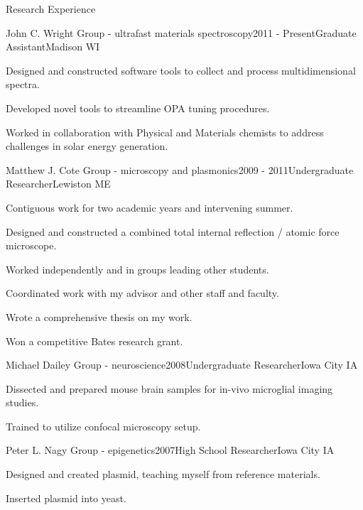 \documentclass{resume}  %
\begin{document}
\begin{rSection}{Research Experience}

\begin{rSubsection}{John C. Wright Group - ultrafast materials spectroscopy}{2011 - Present}{Graduate Assistant}{Madison WI}
\item Designed and constructed software tools to collect and process multidimensional spectra.
\item Developed novel tools to streamline OPA tuning procedures.
\item Worked in collaboration with Physical and Materials chemists to address challenges in solar energy generation.
\end{rSubsection}

\begin{rSubsection}{Matthew J. Cote Group - microscopy and plasmonics}{2009 - 2011}{Undergraduate Researcher}{Lewiston ME}
\item Contiguous work for two academic years and intervening summer.
\item Designed and constructed a combined total internal reflection / atomic force microscope.
\item Worked independently and in groups leading other students.
\item Coordinated work with my advisor and other staff and faculty.
\item Wrote a comprehensive thesis on my work.
\item Won a competitive Bates research grant.
\end{rSubsection}

\pagebreak
\begin{rSubsection}{Michael Dailey Group - neuroscience}{2008}{Undergraduate Researcher}{Iowa City IA}
\item Dissected and prepared mouse brain samples for in-vivo microglial imaging studies.
\item Trained to utilize confocal microscopy setup.
\end{rSubsection}

\begin{rSubsection}{Peter L. Nagy Group - epigenetics}{2007}{High School Researcher}{Iowa City IA}
\item Designed and created plasmid, teaching myself from reference materials.
\item Inserted plasmid into yeast.
\end{rSubsection}

\end{rSection}
\end{document}
